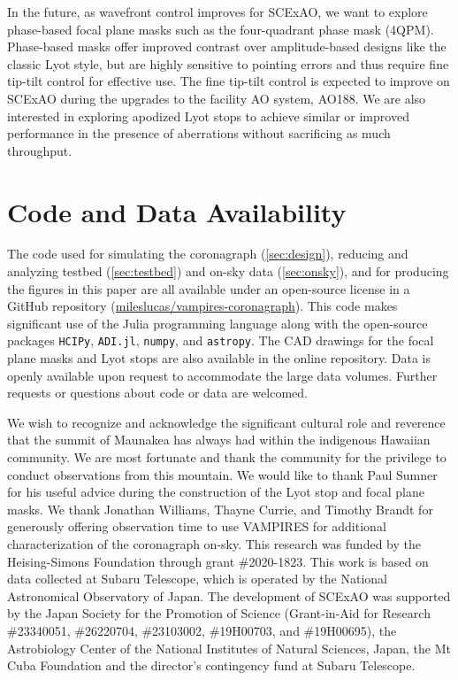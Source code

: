 \documentclass[]{spie}  %
\begin{document}
In the future, as wavefront control improves for SCExAO, we want to explore phase-based focal plane masks such as the four-quadrant phase mask (4QPM)\cite{rouanFourQuadrantPhase2007}. Phase-based masks offer improved contrast over amplitude-based designs like the classic Lyot style, but are highly sensitive to pointing errors and thus require fine tip-tilt control for effective use\cite{huby2017}. The fine tip-tilt control is expected to improve on SCExAO during the upgrades to the facility AO system, AO188\cite{minowa2010}. We are also interested in exploring apodized Lyot stops to achieve similar or improved performance in the presence of aberrations without sacrificing as much throughput.


\appendix    %


\section{Code and Data Availability}\label{sec:code}

The code used for simulating the coronagraph (\autoref{sec:design}), reducing and analyzing testbed (\autoref{sec:testbed}) and on-sky data (\autoref{sec:onsky}), and for producing the figures in this paper are all available under an open-source license in a GitHub repository (\href{https://github.com/mileslucas/vampires-coronagraph}{mileslucas/vampires-coronagraph}). This code makes significant use of the Julia programming language\cite{bezanson2017} along with the open-source packages \texttt{HCIPy}\cite{por2018}, \texttt{ADI.jl}\cite{lucas2020}, \texttt{numpy}\cite{harris2020}, and \texttt{astropy}\cite{astropycollaboration2013,astropycollaboration2018}. The CAD drawings for the focal plane masks and Lyot stops are also available in the online repository. Data is openly available upon request to accommodate the large data volumes. Further requests or questions about code or data are welcomed.

\acknowledgments

We wish to recognize and acknowledge the significant cultural role and reverence that the summit of Maunakea has always had within the indigenous Hawaiian community. We are most fortunate and thank the community for the privilege to conduct observations from this mountain. We would like to thank Paul Sumner for his useful advice during the construction of the Lyot stop and focal plane masks. We thank Jonathan Williams, Thayne Currie, and Timothy Brandt for generously offering observation time to use VAMPIRES for additional characterization of the coronagraph on-sky. This research was funded by the Heising-Simons Foundation through grant \#2020-1823. This work is based on data collected at Subaru Telescope, which is operated by the National Astronomical Observatory of Japan. The development of SCExAO was supported by the Japan Society for the Promotion of Science (Grant-in-Aid for Research \#23340051, \#26220704, \#23103002, \#19H00703, and \#19H00695), the Astrobiology Center of the National Institutes of Natural Sciences, Japan, the Mt Cuba Foundation and the director's contingency fund at Subaru Telescope. 


\end{document}
